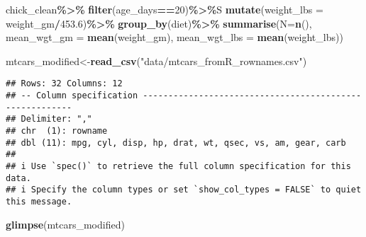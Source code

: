 \documentclass[
]{article}
\newenvironment{Shaded}{\begin{snugshade}}{\end{snugshade}}
\newcommand{\AttributeTok}[1]{\textcolor[rgb]{0.13,0.29,0.53}{#1}}
\newcommand{\DecValTok}[1]{\textcolor[rgb]{0.00,0.00,0.81}{#1}}
\newcommand{\FloatTok}[1]{\textcolor[rgb]{0.00,0.00,0.81}{#1}}
\newcommand{\FunctionTok}[1]{\textcolor[rgb]{0.13,0.29,0.53}{\textbf{#1}}}
\newcommand{\NormalTok}[1]{#1}
\newcommand{\OtherTok}[1]{\textcolor[rgb]{0.56,0.35,0.01}{#1}}
\newcommand{\SpecialCharTok}[1]{\textcolor[rgb]{0.81,0.36,0.00}{\textbf{#1}}}
\newcommand{\StringTok}[1]{\textcolor[rgb]{0.31,0.60,0.02}{#1}}
\begin{document}
\begin{Shaded}
\begin{Highlighting}[]
\NormalTok{chick\_clean}\SpecialCharTok{\%\textgreater{}\%}
  \FunctionTok{filter}\NormalTok{(age\_days}\SpecialCharTok{==}\DecValTok{20}\NormalTok{)}\SpecialCharTok{\%\textgreater{}\%}\NormalTok{S}
  \FunctionTok{mutate}\NormalTok{(}\AttributeTok{weight\_lbs =}\NormalTok{ weight\_gm}\SpecialCharTok{/}\FloatTok{453.6}\NormalTok{)}\SpecialCharTok{\%\textgreater{}\%}
  \FunctionTok{group\_by}\NormalTok{(diet)}\SpecialCharTok{\%\textgreater{}\%}
  \FunctionTok{summarise}\NormalTok{(}\AttributeTok{N=}\FunctionTok{n}\NormalTok{(), }\AttributeTok{mean\_wgt\_gm =} \FunctionTok{mean}\NormalTok{(weight\_gm), }\AttributeTok{mean\_wgt\_lbs =} \FunctionTok{mean}\NormalTok{(weight\_lbs))}
\end{Highlighting}
\end{Shaded}

\begin{Shaded}
\begin{Highlighting}[]
\NormalTok{mtcars\_modified}\OtherTok{\textless{}{-}}\FunctionTok{read\_csv}\NormalTok{(}\StringTok{"data/mtcars\_fromR\_rownames.csv"}\NormalTok{)}
\end{Highlighting}
\end{Shaded}

\begin{verbatim}
## Rows: 32 Columns: 12
## -- Column specification --------------------------------------------------------
## Delimiter: ","
## chr  (1): rowname
## dbl (11): mpg, cyl, disp, hp, drat, wt, qsec, vs, am, gear, carb
## 
## i Use `spec()` to retrieve the full column specification for this data.
## i Specify the column types or set `show_col_types = FALSE` to quiet this message.
\end{verbatim}

\begin{Shaded}
\begin{Highlighting}[]
\FunctionTok{glimpse}\NormalTok{(mtcars\_modified)}
\end{Highlighting}
\end{Shaded}
\end{document}
